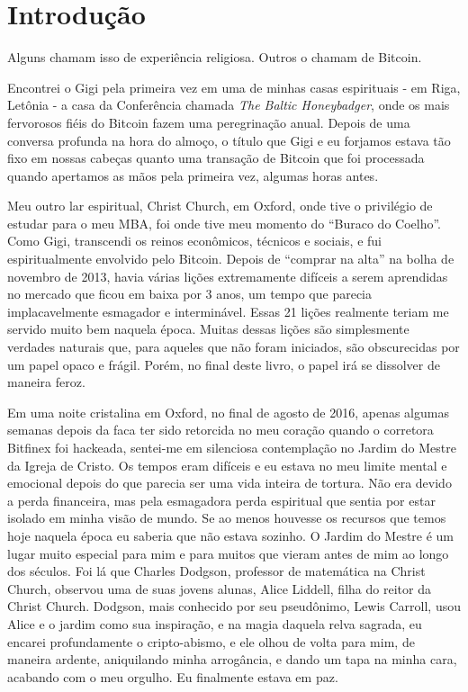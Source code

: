 \chapter*{Introdução}

Alguns chamam isso de experiência religiosa. Outros o chamam de Bitcoin.

Encontrei o Gigi pela primeira vez em uma de minhas casas espirituais - em Riga, Letônia - a casa da Conferência chamada \textit{The Baltic Honeybadger}, onde os mais fervorosos fiéis do Bitcoin fazem uma peregrinação anual. Depois de uma conversa profunda na hora do almoço, o título que Gigi e eu forjamos estava tão fixo em nossas cabeças quanto uma transação de Bitcoin que foi processada quando apertamos as mãos pela primeira vez, algumas horas antes.

Meu outro lar espiritual, Christ Church, em Oxford, onde tive o privilégio de estudar para o meu MBA, foi onde tive meu momento do \enquote{Buraco do Coelho}. Como Gigi, transcendi os reinos econômicos, técnicos e sociais, e fui espiritualmente envolvido pelo Bitcoin. Depois de \enquote{comprar na alta} na bolha de novembro de 2013, havia várias lições extremamente difíceis a serem aprendidas no mercado que ficou em baixa por 3 anos, um tempo que parecia implacavelmente esmagador e interminável. Essas 21 lições realmente teriam me servido muito bem naquela época. Muitas dessas lições são simplesmente verdades naturais que, para aqueles que não foram iniciados, são obscurecidas por um papel opaco e frágil. Porém, no final deste livro, o papel irá se dissolver de maneira feroz.

Em uma noite cristalina em Oxford, no final de agosto de 2016, apenas algumas semanas depois da faca ter sido retorcida no meu coração quando o corretora Bitfinex foi hackeada, sentei-me em silenciosa contemplação no Jardim do Mestre da Igreja de Cristo. Os tempos eram difíceis e eu estava no meu limite mental e emocional depois do que parecia ser uma vida inteira de tortura. Não era devido a perda financeira, mas pela esmagadora perda espiritual que sentia por estar isolado em minha visão de mundo. Se ao menos houvesse os recursos que temos hoje naquela época eu saberia que não estava sozinho. O Jardim do Mestre é um lugar muito especial para mim e para muitos que vieram antes de mim ao longo dos séculos. Foi lá que Charles Dodgson, professor de matemática na Christ Church, observou uma de suas jovens alunas, Alice Liddell, filha do reitor da Christ Church. Dodgson, mais conhecido por seu pseudônimo, Lewis Carroll, usou Alice e o jardim como sua inspiração, e na magia daquela relva sagrada, eu encarei profundamente o cripto-abismo, e ele olhou de volta para mim, de maneira ardente, aniquilando minha arrogância, e dando um tapa na minha cara, acabando com o meu orgulho. Eu finalmente estava em paz.

